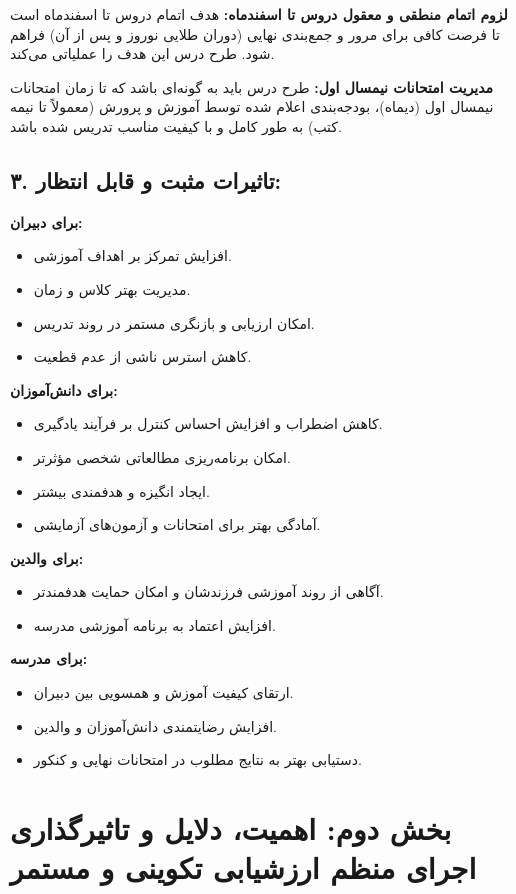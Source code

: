 \documentclass[a4paper,14pt]{article}
\begin{document}
\textbf{لزوم اتمام منطقی و معقول دروس تا اسفندماه:}  هدف اتمام دروس تا اسفندماه است تا فرصت کافی برای مرور و جمع‌بندی نهایی (دوران طلایی نوروز و پس از آن) فراهم شود. طرح درس این هدف را عملیاتی می‌کند.

\textbf{مدیریت امتحانات نیمسال اول:} طرح درس باید به گونه‌ای باشد که تا زمان امتحانات نیمسال اول (دیماه)، بودجه‌بندی اعلام شده توسط آموزش و پرورش (معمولاً تا نیمه کتب) به طور کامل و با کیفیت مناسب تدریس شده باشد.
\medskip

\subsection*{۳. تاثیرات مثبت و قابل انتظار:}
\textbf{برای دبیران:}
\begin{itemize}
    \item افزایش تمرکز بر اهداف آموزشی.
    \item مدیریت بهتر کلاس و زمان.
    \item امکان ارزیابی و بازنگری مستمر در روند تدریس.
    \item کاهش استرس ناشی از عدم قطعیت.
\end{itemize}
\textbf{برای دانش‌آموزان:}
\begin{itemize}
    \item کاهش اضطراب و افزایش احساس کنترل بر فرآیند یادگیری.
    \item امکان برنامه‌ریزی مطالعاتی شخصی مؤثرتر.
    \item ایجاد انگیزه و هدفمندی بیشتر.
    \item آمادگی بهتر برای امتحانات و آزمون‌های آزمایشی.
\end{itemize}
\textbf{برای والدین:}
\begin{itemize}
    \item آگاهی از روند آموزشی فرزندشان و امکان حمایت هدفمندتر.
    \item افزایش اعتماد به برنامه آموزشی مدرسه.
\end{itemize}
\textbf{برای مدرسه:}
\begin{itemize}
    \item ارتقای کیفیت آموزش و همسویی بین دبیران.
    \item افزایش رضایتمندی دانش‌آموزان و والدین.
    \item دستیابی بهتر به نتایج مطلوب در امتحانات نهایی و کنکور.
\end{itemize}
\newpage
\section*{بخش دوم: اهمیت، دلایل و تاثیرگذاری اجرای منظم ارزشیابی تکوینی و مستمر}
\bigskip
\end{document}
